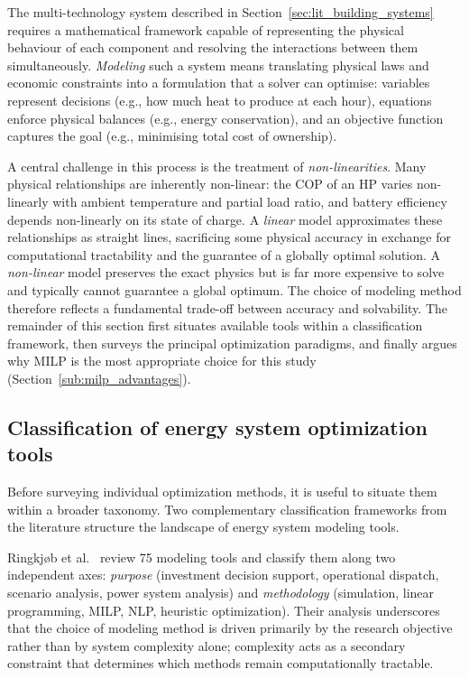 \documentclass[11pt,a4paper]{report}
\begin{document}
The multi-technology system described in Section~\ref{sec:lit_building_systems} requires a mathematical framework capable of representing the physical behaviour of each component and resolving the interactions between them simultaneously.
\textit{Modeling} such a system means translating physical laws and economic constraints into a formulation that a solver can optimise: variables represent decisions (e.g., how much heat to produce at each hour), equations enforce physical balances (e.g., energy conservation), and an objective function captures the goal (e.g., minimising total cost of ownership).

A central challenge in this process is the treatment of \textit{non-linearities}.
Many physical relationships are inherently non-linear: the COP of an HP varies non-linearly with ambient temperature and partial load ratio, and battery efficiency depends non-linearly on its state of charge.
A \textit{linear} model approximates these relationships as straight lines, sacrificing some physical accuracy in exchange for computational tractability and the guarantee of a globally optimal solution.
A \textit{non-linear} model preserves the exact physics but is far more expensive to solve and typically cannot guarantee a global optimum.
The choice of modeling method therefore reflects a fundamental trade-off between accuracy and solvability.
The remainder of this section first situates available tools within a classification framework, then surveys the principal optimization paradigms, and finally argues why MILP is the most appropriate choice for this study (Section~\ref{sub:milp_advantages}).

\subsection{Classification of energy system optimization tools}
\label{sub:lit_tool_classification}

Before surveying individual optimization methods, it is useful to situate them within a broader taxonomy.
Two complementary classification frameworks from the literature structure the landscape of energy system modeling tools.

Ringkj{\o}b et al.~\cite{Ringkjob2018} review 75 modeling tools and classify them along two independent axes: \textit{purpose} (investment decision support, operational dispatch, scenario analysis, power system analysis) and \textit{methodology} (simulation, linear programming, MILP, NLP, heuristic optimization).
Their analysis underscores that the choice of modeling method is driven primarily by the research objective rather than by system complexity alone; complexity acts as a secondary constraint that determines which methods remain computationally tractable.
\end{document}

